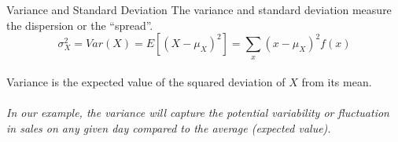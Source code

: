 \documentclass{./../div_teaching_slides}
\begin{document}

\begin{frame}{Variance and Standard Deviation}
The variance and standard deviation measure the dispersion or the ``spread''. \\
$$ \sigma^2_X =   Var(X) = E[(X-\mu_X)^2] =  \sum_{x} (x-\mu_X)^2 f(x) $$ \\
Variance is the expected value of the squared deviation of $X$ from its mean. \\~\\
\textit{In our example, the variance will capture the potential variability or fluctuation in sales on any given day compared to the average (expected value).}
\end{frame}

\end{document}

